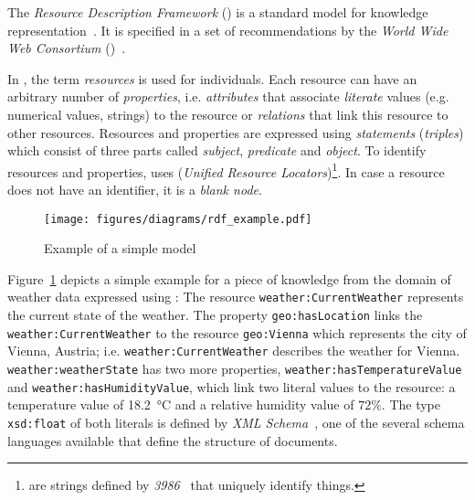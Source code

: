 The \emph{Resource Description Framework} () is a standard model for knowledge representation~\cite{RDF}. It is specified in a set of recommendations by the \emph{World Wide Web Consortium} ()~\cite{W3C}.

In , the term \emph{resources} is used for individuals. Each resource can have an arbitrary number of \emph{properties}, i.e. \emph{attributes} that associate \emph{literate} values (e.g. numerical values, strings) to the resource or \emph{relations} that link this resource to other resources. Resources and properties are expressed using \emph{statements} (\emph{triples}) which consist of three parts called \emph{subject}, \emph{predicate} and \emph{object}. To identify resources and properties,  uses  (\emph{Unified Resource Locators})\footnote{ are strings defined by \emph{ 3986}~\cite{rfc3986} that uniquely identify things.}. In case a resource does not have an identifier, it is a \emph{blank node}.

\begin{figure}
\centering
\texttt{[image: figures/diagrams/rdf\_example.pdf]}
\caption{Example of a simple  model}
\label{fig:rdf_example}
\end{figure}

Figure~\ref{fig:rdf_example} depicts a simple example for a piece of knowledge from the domain of weather data expressed using : The resource \texttt{weather:\hspace{0pt}Current\hspace{0pt}Weather} represents the current state of the weather. The property \texttt{geo:\hspace{0pt}has\hspace{0pt}Location} links the \texttt{weather:\hspace{0pt}Current\hspace{0pt}Weather} to the resource \texttt{geo:\hspace{0pt}Vienna} which represents the city of Vienna, Austria; i.e. \texttt{weather:\hspace{0pt}Current\hspace{0pt}Weather} describes the weather for Vienna. \texttt{weather:\hspace{0pt}weather\hspace{0pt}State} has two more properties, \texttt{weather:\hspace{0pt}has\hspace{0pt}Temperature\hspace{0pt}Value} and \texttt{weather:\hspace{0pt}has\hspace{0pt}Humidity\hspace{0pt}Value}, which link two literal values to the resource: a temperature value of \SI{18.2}{\celsius} and a relative humidity value of $72 \%$.
The type \texttt{xsd:\hspace{0pt}float} of both literals is defined by \emph{XML Schema}~\cite{xml-schema,xml-schema-datatypes}, one of the several  schema languages available that define the structure of  documents.

